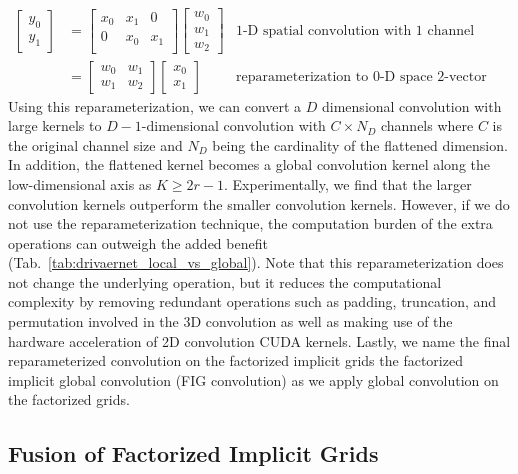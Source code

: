 \begin{align}
    \begin{bmatrix}
        y_0 \\
        y_1
    \end{bmatrix}
    & = \begin{bmatrix}
        x_0 & x_1 & 0 \\
        0 & x_0 & x_1 \\
    \end{bmatrix}
    \begin{bmatrix}
        w_0 \\
        w_1 \\
        w_2
    \end{bmatrix} & \text{1-D spatial convolution with 1 channel}\\
    & = 
    \begin{bmatrix}
        w_0 & w_1 \\
        w_1 & w_2
    \end{bmatrix}
    \begin{bmatrix}
        x_0 \\ x_1
    \end{bmatrix} & \text{reparameterization to 0-D space 2-vector matmul}
\end{align}
Using this reparameterization, we can convert a $D$ dimensional convolution with large kernels to $D-1$-dimensional convolution with $C\times N_D$ channels  where $C$ is the original channel size and $N_D$ being the cardinality of the flattened dimension.
In addition, the flattened kernel becomes a global convolution kernel along the low-dimensional axis as $K \ge 2r - 1$.
Experimentally, we find that the larger convolution kernels outperform the smaller convolution kernels. However, if we do not use the reparameterization technique, the computation burden of the extra operations can outweigh the added benefit (Tab.~\ref{tab:drivaernet_local_vs_global}).
Note that this reparameterization does not change the underlying operation, but it reduces the computational complexity by removing redundant operations such as padding, truncation, and permutation involved in the 3D convolution as well as making use of the hardware acceleration of 2D convolution CUDA kernels.
Lastly, we name the final reparameterized convolution on the factorized implicit grids the factorized implicit global convolution (FIG convolution) as we apply global convolution on the factorized grids.

\subsection{Fusion of Factorized Implicit Grids}
\label{sec:fusion}

